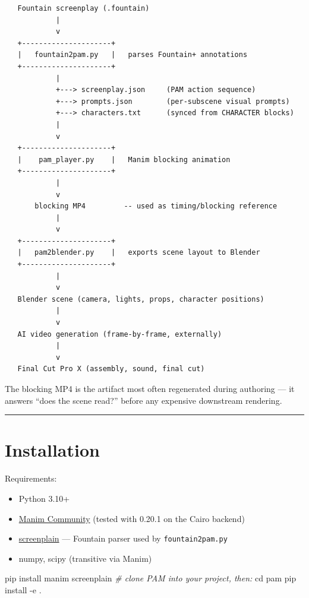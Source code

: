 \documentclass[
  11pt,
]{book}
\newenvironment{Shaded}{}{}
\newcommand{\AttributeTok}[1]{\textcolor[rgb]{0.49,0.56,0.16}{#1}}
\newcommand{\BuiltInTok}[1]{\textcolor[rgb]{0.00,0.50,0.00}{#1}}
\newcommand{\CommentTok}[1]{\textcolor[rgb]{0.38,0.63,0.69}{\textit{#1}}}
\newcommand{\ExtensionTok}[1]{#1}
\newcommand{\NormalTok}[1]{#1}
\providecommand{\tightlist}{%
  \setlength{\itemsep}{0pt}\setlength{\parskip}{0pt}}
\begin{document}
\begin{verbatim}
   Fountain screenplay (.fountain)
            |
            v
   +---------------------+
   |   fountain2pam.py   |   parses Fountain+ annotations
   +---------------------+
            |
            +---> screenplay.json     (PAM action sequence)
            +---> prompts.json        (per-subscene visual prompts)
            +---> characters.txt      (synced from CHARACTER blocks)
            |
            v
   +---------------------+
   |    pam_player.py    |   Manim blocking animation
   +---------------------+
            |
            v
       blocking MP4         -- used as timing/blocking reference
            |
            v
   +---------------------+
   |   pam2blender.py    |   exports scene layout to Blender
   +---------------------+
            |
            v
   Blender scene (camera, lights, props, character positions)
            |
            v
   AI video generation (frame-by-frame, externally)
            |
            v
   Final Cut Pro X (assembly, sound, final cut)
\end{verbatim}

The blocking MP4 is the artifact most often regenerated during authoring
--- it answers ``does the scene read?'' before any expensive downstream
rendering.

\begin{center}\rule{0.5\linewidth}{0.5pt}\end{center}

\section{Installation}\label{installation}

Requirements:

\begin{itemize}
\tightlist
\item
  Python 3.10+
\item
  \href{https://www.manim.community/}{Manim Community} (tested with
  0.20.1 on the Cairo backend)
\item
  \href{https://pypi.org/project/screenplain/}{screenplain} --- Fountain
  parser used by \texttt{fountain2pam.py}
\item
  numpy, scipy (transitive via Manim)
\end{itemize}

\begin{Shaded}
\begin{Highlighting}[]
\ExtensionTok{pip}\NormalTok{ install manim screenplain}
\CommentTok{\# clone PAM into your project, then:}
\BuiltInTok{cd}\NormalTok{ pam}
\ExtensionTok{pip}\NormalTok{ install }\AttributeTok{{-}e}\NormalTok{ .}
\end{Highlighting}
\end{Shaded}
\end{document}
